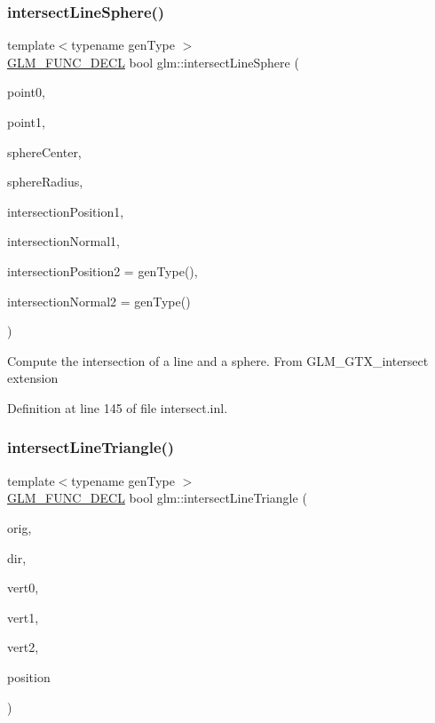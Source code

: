 \subsubsection{\texorpdfstring{intersectLineSphere()}{intersectLineSphere()}}
{\footnotesize\ttfamily template$<$typename gen\+Type $>$ \\
\mbox{\hyperlink{setup_8hpp_ab2d052de21a70539923e9bcbf6e83a51}{G\+L\+M\+\_\+\+F\+U\+N\+C\+\_\+\+D\+E\+CL}} bool glm\+::intersect\+Line\+Sphere (\begin{DoxyParamCaption}\item[{gen\+Type const \&}]{point0,  }\item[{gen\+Type const \&}]{point1,  }\item[{gen\+Type const \&}]{sphere\+Center,  }\item[{typename gen\+Type\+::value\+\_\+type}]{sphere\+Radius,  }\item[{gen\+Type \&}]{intersection\+Position1,  }\item[{gen\+Type \&}]{intersection\+Normal1,  }\item[{gen\+Type \&}]{intersection\+Position2 = {\ttfamily genType()},  }\item[{gen\+Type \&}]{intersection\+Normal2 = {\ttfamily genType()} }\end{DoxyParamCaption})}

Compute the intersection of a line and a sphere. From G\+L\+M\+\_\+\+G\+T\+X\+\_\+intersect extension 

Definition at line 145 of file intersect.\+inl.

\mbox{\label{group__gtx__intersect_ga9d29b9b3acb504d43986502f42740df4}} 
\subsubsection{\texorpdfstring{intersectLineTriangle()}{intersectLineTriangle()}}
{\footnotesize\ttfamily template$<$typename gen\+Type $>$ \\
\mbox{\hyperlink{setup_8hpp_ab2d052de21a70539923e9bcbf6e83a51}{G\+L\+M\+\_\+\+F\+U\+N\+C\+\_\+\+D\+E\+CL}} bool glm\+::intersect\+Line\+Triangle (\begin{DoxyParamCaption}\item[{gen\+Type const \&}]{orig,  }\item[{gen\+Type const \&}]{dir,  }\item[{gen\+Type const \&}]{vert0,  }\item[{gen\+Type const \&}]{vert1,  }\item[{gen\+Type const \&}]{vert2,  }\item[{gen\+Type \&}]{position }\end{DoxyParamCaption})}

